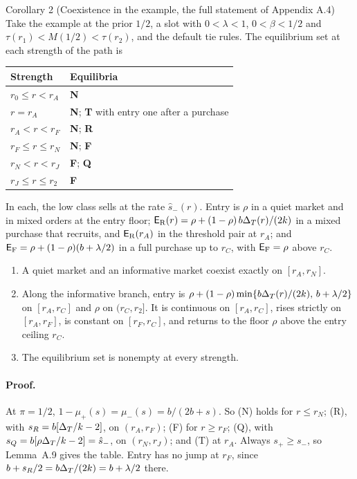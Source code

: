 \begin{paperresult}{Corollary 2 (Coexistence in the example, the full statement of Appendix A.4)}
Take the example at the prior \(1/2\), a slot with \(0<\lambda<1\), \(0<\beta<1/2\) and \(\tau(r_1)<M(1/2)<\tau(r_2)\),
and the default tie rules. The equilibrium set at each strength of the path is
\begin{center}\upshape
\begin{tabular}{@{}ll@{}}
\toprule
Strength & Equilibria\\
\midrule
\(r_0\le r<r_A\) & \textbf{N}\\
\(r=r_A\) & \textbf{N}; \textbf{T} with entry one after a purchase\\
\(r_A<r<r_F\) & \textbf{N}; \textbf{R}\\
\(r_F\le r\le r_N\) & \textbf{N}; \textbf{F}\\
\(r_N<r<r_J\) & \textbf{F}; \textbf{Q}\\
\(r_J\le r\le r_2\) & \textbf{F}\\
\bottomrule
\end{tabular}
\end{center}
In each, the low class sells at the rate \(\hat s_-(r)\). Entry is \(\rho\) in a quiet market and in mixed orders at
the entry floor; \(\mathsf{E}_{\rm R}(r)=\rho+(1-\rho)\,b\Delta_T(r)/(2k)\) in a mixed purchase that recruits, and
\(\mathsf{E}_{\rm R}(r_A)\) in the threshold pair at \(r_A\); and \(\mathsf{E}_{\rm F}=\rho+(1-\rho)(b+\lambda/2)\) in a full
purchase up to \(r_C\), with \(\mathsf{E}_{\rm F}=\rho\) above \(r_C\).
\begin{enumerate}[label=(\alph*),leftmargin=2em]
\item A quiet market and an informative market coexist exactly on \([r_A,r_N]\).
\item Along the informative branch, entry is \(\rho+(1-\rho)\min\{b\Delta_T(r)/(2k),\,b+\lambda/2\}\) on \([r_A,r_C]\) and
\(\rho\) on \((r_C,r_2]\). It is continuous on \([r_A,r_C]\), rises strictly on \([r_A,r_F]\), is constant on
\([r_F,r_C]\), and returns to the floor \(\rho\) above the entry ceiling \(r_C\).
\item The equilibrium set is nonempty at every strength.
\end{enumerate}
\end{paperresult}

\paragraph{Proof.} At \(\pi=1/2\), \(1-\mu_+(s)=\mu_-(s)=b/(2b+s)\). So (N) holds for \(r\le r_N\); (R), with
\(s_R=b[\Delta_T/k-2]\), on \((r_A,r_F)\); (F) for \(r\ge r_F\); (Q), with \(s_Q=b[\rho\Delta_T/k-2]=\hat s_-\), on
\((r_N,r_J)\); and (T) at \(r_A\). Always \(s_+\ge s_-\), so Lemma~A.9 gives the table. Entry has no jump at \(r_F\),
since \(b+s_R/2=b\Delta_T/(2k)=b+\lambda/2\) there.

